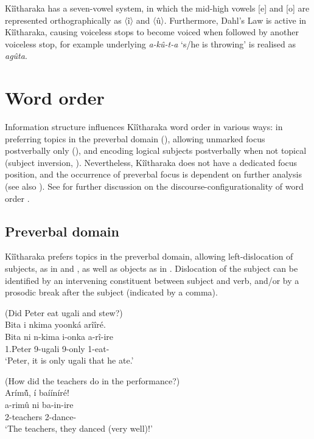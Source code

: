\documentclass[output=paper]{langscibook}
\begin{document}
Kîîtharaka has a seven-vowel system, in which the mid-high vowels [e] and [o] are represented orthographically as 〈î〉 and 〈û〉. Furthermore, Dahl’s Law is active in Kîîtharaka, causing voiceless stops to become voiced when followed by another voiceless stop, for example underlying \textit{a-kû-t-a} `s/he is throwing' is realised as \textit{agûta}.

\section{Word order}
\label{kitwordorder}

Information structure influences Kîîtharaka word order in various ways: in preferring topics in the preverbal domain (), allowing unmarked focus postverbally only (), and encoding logical subjects postverbally when not topical (subject inversion, ). Nevertheless, Kîîtharaka does not have a dedicated focus position, and the occurrence of preverbal focus is dependent on further analysis (see also ). See for further discussion on the discourse-configurationality of word order \citet{KerrEtAl2023}.

\subsection{Preverbal domain}
\label{bkm:Ref115858011}
Kîîtharaka prefers topics in the preverbal domain, allowing left-dislocation of subjects, as in  and , as well as objects as in . Dislocation of the subject can be identified by an intervening constituent between subject and verb, and/or by a prosodic break after the subject (indicated by a comma).

\ea
\label{bkm:Ref115858173}
(Did Peter eat ugali and stew?)\\
 Bita i nkima yoonká arîîré.\\
\gll
Bita  ni  n-kima  i-onka  a-rî-ire\\
1.Peter \FOC{} 9-ugali  9-only  1\SM{}-eat-\PFV{}\\
\glt
‘Peter, it is only ugali that he ate.’

\z

\ea
\label{bkm:Ref115858192}
(How did the teachers do in the performance?)\\
 Arím\v{û}, í baííníré!\\
\gll
a-rimû  ni  ba-in-ire\\
2-teachers \FOC{} 2\SM{}-dance-\PFV{}\\
\glt
‘The teachers, they danced (very well)!’
\end{document}
